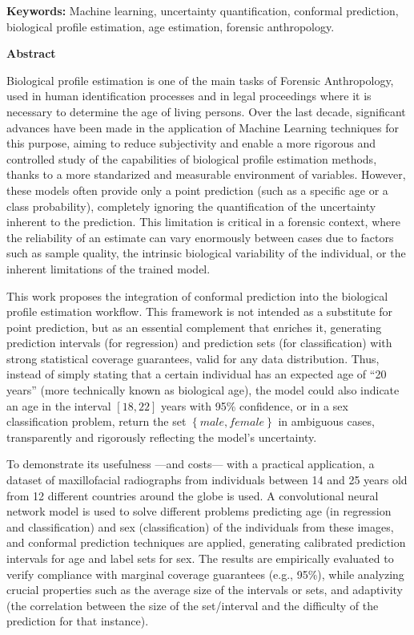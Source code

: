 \noindent\textbf{Keywords:} Machine learning, uncertainty quantification, conformal prediction, biological profile estimation, age estimation, forensic anthropology.

\vspace{0.7cm}

\noindent\textbf{Abstract}

Biological profile estimation is one of the main tasks of Forensic Anthropology, used in human identification processes and in legal proceedings where it is necessary to determine the age of living persons. Over the last decade, significant advances have been made in the application of Machine Learning techniques for this purpose, aiming to reduce subjectivity and enable a more rigorous and controlled study of the capabilities of biological profile estimation methods, thanks to a more standarized and measurable environment of variables. However, these models often provide only a point prediction (such as a specific age or a class probability), completely ignoring the quantification of the uncertainty inherent to the prediction.
This limitation is critical in a forensic context, where the reliability of an estimate can vary enormously between cases due to factors such as sample quality, the intrinsic biological variability of the individual, or the inherent limitations of the trained model.

This work proposes the integration of conformal prediction into the biological profile estimation workflow. This framework is not intended as a substitute for point prediction, but as an essential complement that enriches it, generating prediction intervals (for regression) and prediction sets (for classification) with strong statistical coverage guarantees, valid for any data distribution. Thus, instead of simply stating that a certain individual has an expected age of ``20 years'' (more technically known as biological age), the model could also indicate an age in the interval $[18, 22]$ years with 95\% confidence, or in a sex classification problem, return the set $\left\{male, female\right\}$ in ambiguous cases, transparently and rigorously reflecting the model's uncertainty.

To demonstrate its usefulness ---and costs--- with a practical application, a dataset of maxillofacial radiographs from individuals between 14 and 25 years old from 12 different countries around the globe is used. A convolutional neural network model is used to solve different problems predicting age (in regression and classification) and sex (classification) of the individuals from these images, and conformal prediction techniques are applied, generating calibrated prediction intervals for age and label sets for sex. The results are empirically evaluated to verify compliance with marginal coverage guarantees (e.g., 95\%), while analyzing crucial properties such as the average size of the intervals or sets, and adaptivity (the correlation between the size of the set/interval and the difficulty of the prediction for that instance).


